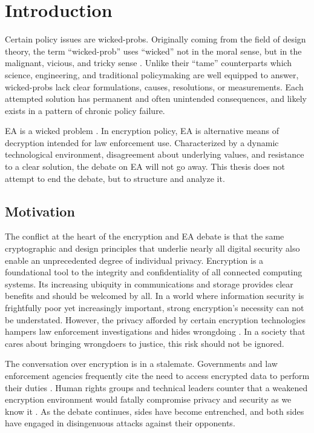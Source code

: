 \chapter{Introduction}
\label{chap-introduction}

Certain policy issues are \acp{wicked-prob}. Originally coming from the field of design theory, the term
``\ac{wicked-prob}'' uses ``wicked'' not in the moral sense, but in the malignant, vicious, and tricky sense
\cite{rittel_dilemmas_1973}. Unlike their ``tame'' counterparts which science, engineering, and traditional policymaking
are well equipped to answer, \acp{wicked-prob} lack clear formulations, causes, resolutions, or measurements. Each
attempted solution has permanent and often unintended consequences, and likely exists in a pattern of chronic policy
failure.

\Acl{EA} is a wicked problem \cite{rozenshtein_wicked_2018}. In encryption policy, \ac{EA} is alternative means of
decryption intended for law enforcement use. Characterized by a dynamic technological environment, disagreement about
underlying values, and resistance to a clear solution, the debate on \ac{EA} will not go away. This thesis does not
attempt to end the debate, but to structure and analyze it.


\section{Motivation}
\label{sec-motivation}

The conflict at the heart of the encryption and \ac{EA} debate is that the same cryptographic and design principles that
underlie nearly all digital security also enable an unprecedented degree of individual privacy. Encryption is a
foundational tool to the integrity and confidentiality of all connected computing systems. Its increasing ubiquity in
communications and storage provides clear benefits and should be welcomed by all. In a world where information security
is frightfully poor yet increasingly important, strong encryption's necessity can not be understated. However, the
privacy afforded by certain encryption technologies hampers law enforcement investigations and hides wrongdoing
\cite{cox_2020} \cite{keller_internet_2019}. In a society that cares about bringing wrongdoers to justice, this risk
should not be ignored.

The conversation over encryption is in a stalemate. Governments and law enforcement agencies frequently cite the need to
access encrypted data to perform their duties \cite{ministerial_2018} \cite{intl_2020} \cite{fbi_2020}. Human rights
groups and technical leaders counter that a weakened encryption environment would fatally compromise privacy and
security as we know it \cite{abelson_2015} \cite{eightythree_2017} \cite{ruiz_there_2018}. As the debate continues,
sides have become entrenched, and both sides have engaged in disingenuous attacks against their opponents.

